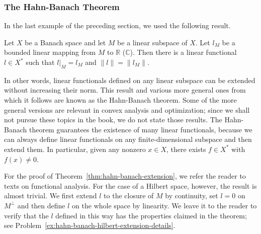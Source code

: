 \subsubsection{The Hahn-Banach Theorem}\label{subsec:hahn-banach-theorem}

In the last example of the preceding section, we used the following result.

\begin{Theorem}
\label{thm:hahn-banach-extension}
Let $X$ be a Banach space and let $M$ be a linear subspace of $X$. Let $l_M$ be a bounded linear mapping from $M$ to $\mathbb{R}$ ($\mathbb{C}$). Then there is a linear functional $l\in X^*$ such that $l|_M=l_M$ and $\|l\|=\|l_M\|$.
\end{Theorem}

In other words, linear functionals defined on any linear subspace can be extended without increasing their norm. This result and various more general ones from which it follows are known as the Hahn-Banach theorem. Some of the more general versions are relevant in convex analysis and optimization; since we shall not pursue these topics in the book, we do not state those results. The Hahn-Banach theorem guarantees the existence of many linear functionals, because we can always define linear functionals on any finite-dimensional subspace and then extend them. In particular, given any nonzero $x\in X$, there exists $f\in X^*$ with $f(x)\ne0$.

For the proof of Theorem~\ref{thm:hahn-banach-extension}, we refer the reader to texts on functional analysis. For the case of a Hilbert space, however, the result is almost trivial. We first extend $l$ to the closure of $M$ by continuity, set $l=0$ on $M^\perp$ and then define $l$ on the whole space by linearity. We leave it to the reader to verify that the $l$ defined in this way has the properties claimed in the theorem; see Problem~\ref{ex:hahn-banach-hilbert-extension-details}.
